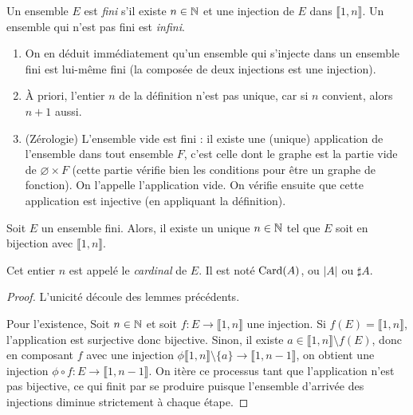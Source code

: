 \begin{definition}
Un ensemble $E$ est \emph{fini} s'il existe $n\in \mathbb{N}$ et une injection de $E$ dans $\llbracket 1,n\rrbracket$. Un ensemble qui n'est pas fini est \emph{infini}.
\end{definition}

\begin{remarque}
\begin{enumerate}[label=\alph*)]
\item On en déduit immédiatement qu'un ensemble qui s'injecte dans un ensemble fini est lui-même fini (la composée de deux injections est une injection).
\item À priori, l'entier $n$ de la définition n'est pas unique, car si $n$ convient, alors $n+1$ aussi.
\item (Zérologie) L'ensemble vide est fini : il existe une (unique) application de l'ensemble dans tout ensemble $F$, c'est celle dont le graphe est la partie vide de $\varnothing\times F$ (cette partie vérifie bien les conditions pour être un graphe de fonction). On l'appelle \og l'application vide\fg.
On vérifie ensuite que cette application est injective (en appliquant la définition).
\end{enumerate}
\end{remarque}


\begin{propdef}
Soit $E$ un ensemble fini. Alors, il existe un unique $n\in \mathbb{N}$ tel que $E$ soit en bijection avec $\llbracket 1,n\rrbracket$.

Cet entier $n$ est appelé le \emph{cardinal} de $E$. Il est noté $\operatorname{Card}(A)$, ou $|A|$ ou $\sharp A$.
\end{propdef}
\begin{proof}
L'unicité découle des lemmes précédents.

Pour l'existence, Soit $n\in \mathbb{N}$ et soit $f : E\to \llbracket 1,n\rrbracket$ une injection.
Si $f(E) = \llbracket 1,n\rrbracket$, l'application est surjective donc bijective.
Sinon, il existe $a\in \llbracket 1,n\rrbracket \setminus f(E)$, donc en composant $f$ avec une injection $\phi \llbracket 1,n\rrbracket \setminus \{a\} \to \llbracket 1,n-1\rrbracket$, on obtient une injection $\phi\circ f : E \to \llbracket 1,n-1\rrbracket$.
On itère ce processus tant que l'application n'est pas bijective, ce qui finit par se produire puisque l'ensemble d'arrivée des injections diminue strictement à chaque étape.
\end{proof}




